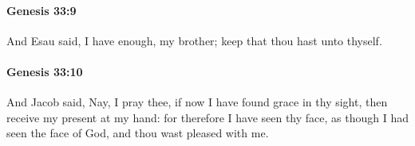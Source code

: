 		\paragraph{Genesis 33:9} %
			\label{GENESIS-33-9}

			And Esau said, I have enough, my brother; keep that thou hast unto thyself.


		\paragraph{Genesis 33:10} %
			\label{GENESIS-33-10}

			And Jacob said, Nay, I pray thee, if now I have found grace in thy sight, then receive my present at my hand: for therefore I have seen thy face, as though I had seen the face of God, and thou wast pleased with me.


